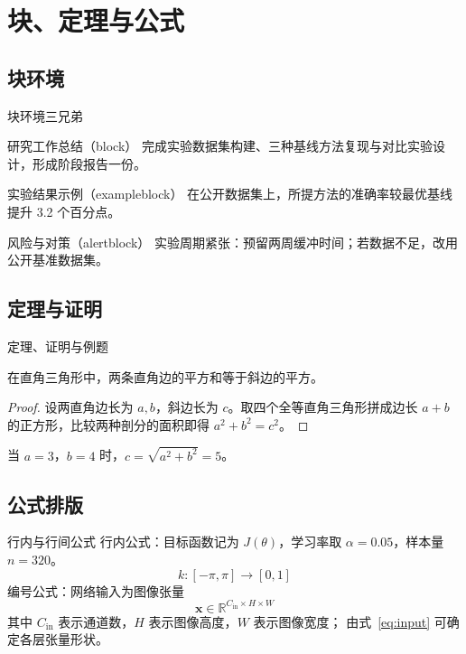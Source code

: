 \section{块、定理与公式}

\subsection{块环境}

\begin{frame}{块环境三兄弟}
  \begin{block}{研究工作总结（block）}
    完成实验数据集构建、三种基线方法复现与对比实验设计，形成阶段报告一份。
  \end{block}
  \begin{exampleblock}{实验结果示例（exampleblock）}
    在公开数据集上，所提方法的准确率较最优基线提升 3.2 个百分点。
  \end{exampleblock}
  \begin{alertblock}{风险与对策（alertblock）}
    实验周期紧张：预留两周缓冲时间；若数据不足，改用公开基准数据集。
  \end{alertblock}
\end{frame}

\subsection{定理与证明}

\begin{frame}{定理、证明与例题}
  \begin{theorem}[勾股定理]
    在直角三角形中，两条直角边的平方和等于斜边的平方。
  \end{theorem}
  \begin{proof}
    设两直角边长为 $a,b$，斜边长为 $c$。取四个全等直角三角形拼成边长
    $a+b$ 的正方形，比较两种剖分的面积即得 $a^2+b^2=c^2$。
  \end{proof}
  \begin{example}
    当 $a=3$，$b=4$ 时，$c=\sqrt{a^2+b^2}=5$。
  \end{example}
\end{frame}

\subsection{公式排版}

\begin{frame}{行内与行间公式}
  \small
  行内公式：目标函数记为 $J(\theta)$，学习率取 $\alpha=0.05$，样本量 $n=320$。
  \[ k:[-\pi,\pi]\rightarrow[0,1] \]
  编号公式：网络输入为图像张量
  \begin{equation}
    \mathbf{x}\in\mathbb{R}^{C_{\text{in}}\times H\times W}
    \label{eq:input}
  \end{equation}
  其中 $C_{\text{in}}$ 表示通道数，$H$ 表示图像高度，$W$ 表示图像宽度；
  由式~\eqref{eq:input} 可确定各层张量形状。
\end{frame}

